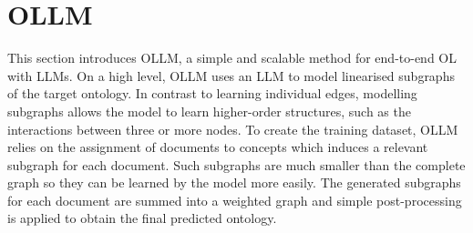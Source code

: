\documentclass{article}
\newcommand{\todo}[1]{\textcolor{red}{TODO: #1}}
\newcommand{\name}{{OLLM}\xspace}
\begin{document}

\section{\name}

This section introduces \name, a simple and scalable method for end-to-end OL with LLMs. On a high level, \name uses an LLM to model linearised subgraphs of the target ontology. In contrast to learning individual edges, modelling subgraphs allows the model to learn higher-order structures, such as the interactions between three or more nodes. To create the training dataset, \name relies on the assignment of documents to concepts which induces a relevant subgraph for each document. Such subgraphs are much smaller than the complete graph so they can be learned by the model more easily. The generated subgraphs for each document are summed into a weighted graph and simple post-processing is applied to obtain the final predicted ontology.

\end{document}

